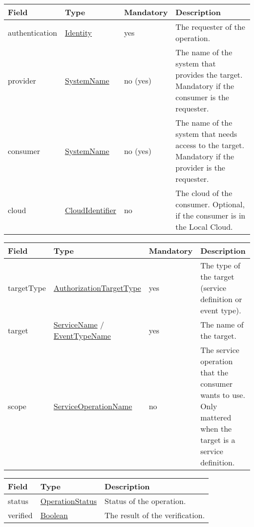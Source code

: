 \documentclass[a4paper]{arrowhead}
\newcommand{\pref}[1]{{\textcolor{ArrowheadGrey}{\hyperref[sec:model:primitives:#1]{#1}}}}
\begin{document}

\begin{table}[ht!]
\begin{tabularx}{\textwidth}{| p{3cm} | p{4cm} | p{2cm} | X |} \hline
\rowcolor{gray!33} Field & Type & Mandatory & Description \\ \hline
authentication &\hyperref[sec:model:Identity]{Identity} & yes & The requester of the operation. \\ \hline
provider & \pref{SystemName} & no (yes) & The name of the system that provides the target. Mandatory if the consumer is the requester. \\ \hline
consumer & \pref{SystemName} & no (yes) & The name of the system that needs access to the target. Mandatory if the provider is the requester. \\ \hline
cloud & \pref{CloudIdentifier} & no & The cloud of the consumer. Optional, if the consumer is in the Local Cloud. \\ \hline
\end{tabularx}
\end{table}

\begin{table}[ht!]
\begin{tabularx}{\textwidth}{| p{3cm} | p{4cm} | p{2cm} | X |} \hline
\rowcolor{gray!33} Field & Type & Mandatory & Description \\ \hline
targetType & \pref{AuthorizationTargetType} & yes & The type of the target (service definition or event type). \\ \hline
target & \pref{ServiceName} / \pref{EventTypeName} & yes & The name of the target. \\ \hline
scope & \pref{ServiceOperationName} & no & The service operation that the consumer wants to use. Only mattered when the target is a service definition. \\ \hline
\end{tabularx}
\end{table}

 
\begin{table}[ht!]
\begin{tabularx}{\textwidth}{| p{4.25cm} | p{4cm} | X |} \hline
\rowcolor{gray!33} Field & Type      & Description \\ \hline
status & \pref{OperationStatus} & Status of the operation. \\ \hline
verified & \pref{Boolean} & The result of the verification. \\ \hline
\end{tabularx}
\end{table}
\end{document}
